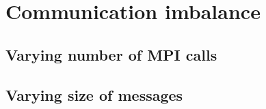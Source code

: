 \section{Communication imbalance}
\label{section:distributed-memory:communication-imbalance}

\subsection{Varying number of MPI calls}

\subsection{Varying size of messages}
